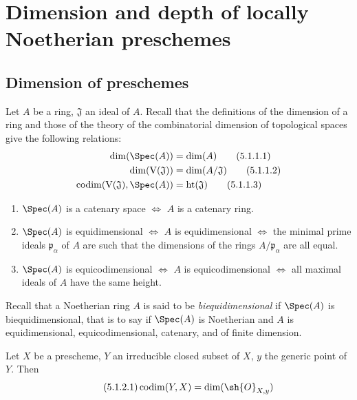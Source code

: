 \section{Dimension and depth of locally Noetherian preschemes}
\label{section:IV.5}

\subsection{Dimension of preschemes}
\label{subsection:IV.5.1}


\begin{env}[5.1.1]
\label{IV.5.1.1}
Let $A$ be a ring, $\mathfrak{J}$ an ideal of $A$.
Recall  that the definitions of the dimension of a ring  and those of the theory of the combinatorial dimension of topological spaces  give the following relations:
\begin{align}
  \dim(\Spec(A)) &= \dim(A) \tag{5.1.1.1}\label{IV.5.1.1.1}\\
  \dim(\mathrm{V}(\mathfrak{J})) &= \dim(A/\mathfrak{J}) \tag{5.1.1.2}\label{IV.5.1.1.2}\\
  \operatorname{codim}(\mathrm{V}(\mathfrak{J}),\Spec(A)) &= \operatorname{ht}(\mathfrak{J}) \tag{5.1.1.3}\label{IV.5.1.1.3}
\end{align}

\medskip
\begin{enumerate}
  \item[\bf(5.1.1.4)] $\Spec(A)$ is a catenary space $\Leftrightarrow$ $A$ is a catenary ring.
  \item[\bf(5.1.1.5)] $\Spec(A)$ is equidimensional $\Leftrightarrow$ $A$ is equidimensional $\Leftrightarrow$ the minimal prime ideals $\mathfrak{p}_\alpha$ of $A$ are such that the dimensions of the rings $A/\mathfrak{p}_\alpha$ are all equal.
  \item[\bf(5.1.1.6)] $\Spec(A)$ is equicodimensional $\Leftrightarrow$ $A$ is equicodimensional $\Leftrightarrow$ all maximal ideals of $A$ have the same height.
\end{enumerate}

Recall that a Noetherian ring $A$ is said to be \emph{biequidimensional} if $\Spec(A)$ is biequidimensional, that is to say if $\Spec(A)$ is Noetherian and $A$ is equidimensional, equicodimensional, catenary, and of finite dimension.
\end{env}

\begin{proposition}[5.1.2]
\label{IV.5.1.2}
Let $X$ be a prescheme, $Y$ an irreducible closed subset of $X$, $y$ the generic point of $Y$.
Then
\[
\tag{5.1.2.1}\label{IV.5.1.2.1}
  \operatorname{codim}(Y, X) = \dim(\sh{O}_{X,y})
\]
\end{proposition}

